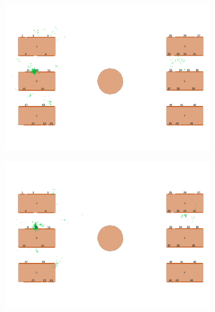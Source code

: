 \documentclass[12pt]{article}
\begin{document}
\begin{figure}[htb!]
    \centering
    \begin{subfigure}[b]{0.3\textwidth}
        \centering
        \includegraphics[width=\textwidth]{images/stop_points_p57_MSN.png}
        \caption{}
        \label{stop_segments_p57_MSN}
    \end{subfigure}
    \hfill
    \begin{subfigure}[b]{0.3\textwidth}
        \centering
        \includegraphics[width=\textwidth]{images/stop_points_p67_MSN.png}
        \caption{}
        \label{stop_segments_p67_MSN}
    \end{subfigure}
    \hfill
    \begin{subfigure}[b]{0.3\textwidth}
        \centering

\end{subfigure}
\end{figure}
\end{document}

